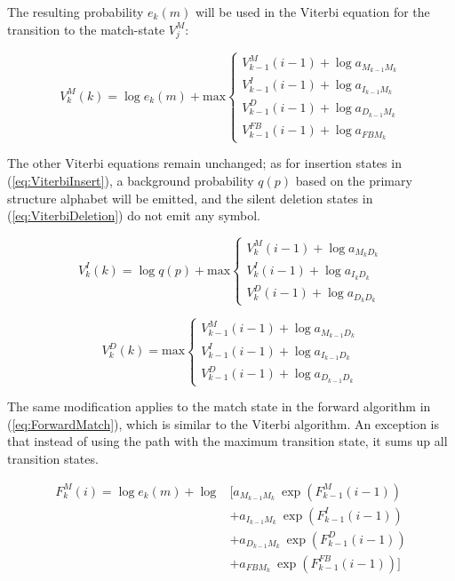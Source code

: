 The resulting probability $e_k(m)$ will be used in the Viterbi equation for the transition to the match-state $V_j^M$:

\begin{equation}
V_k^M(k) = \log e_k(m)+ \text{max} 
\begin{cases}
V_{k-1}^M(i-1) + \log a_{M_{k-1} M_k}\\
V_{k-1}^I(i-1) + \log a_{I_{k-1} M_k}\\
V_{k-1}^D(i -1) + \log a_{D_{k-1} M_k} \\
V_{k-1}^{FB}{(i-1)} + \log a_{FB M_k}
\end{cases}
\label{eq:Viterbi}
\end{equation} 

The other Viterbi equations remain unchanged; as for insertion states in (\ref{eq:ViterbiInsert}), a background probability $q(p)$ based on the primary structure alphabet will be emitted, and the silent deletion states in (\ref{eq:ViterbiDeletion}) do not emit any symbol.

\begin{equation}
V_k^I(k) = \log q(p)+ \text{max} 
\begin{cases}
V_{k}^M(i-1) + \log a_{M_{k} D_k}\\
V_{k}^I(i-1) + \log a_{I_{k} D_k}\\
V_{k}^D(i-1) + \log a_{D_{k} D_k}
\end{cases}
\label{eq:ViterbiInsert}
\end{equation} 


\begin{equation}
V_k^D(k) = \text{max} \begin{cases}
V_{k-1}^M(i-1) + \log a_{M_{k-1} D_k}\\
V_{k-1}^I(i-1) + \log a_{I_{k-1} D_k}\\
V_{k-1}^D(i -1) + \log a_{D_{k-1} D_k} 
\end{cases}
\label{eq:ViterbiDeletion}
\end{equation} 


The same modification applies to the match state in the forward algorithm in (\ref{eq:ForwardMatch}), which is similar to the Viterbi algorithm. An exception is that instead of using the path with the maximum transition state, it sums up all transition states. 

\begin{equation}
\label{eq:ForwardMatch}
\begin{split}
F^M_k(i)= \log e_k(m) + \log&[  a_{M_{k-1}M_k} \: \exp(F_{k-1}^M(i-1))  \\
					 	  &+ a_{I_{k-1}M_k} \: \exp(F_{k-1}^I(i-1))		\\			 	  
					 	  &+ a_{D_{k-1}M_k} \: \exp(F_{k-1}^D(i-1))	\\
					 	  &+a_{FBM_k} \: \exp(F_{k-1}^{FB}(i-1))]
\end{split}
\end{equation}

